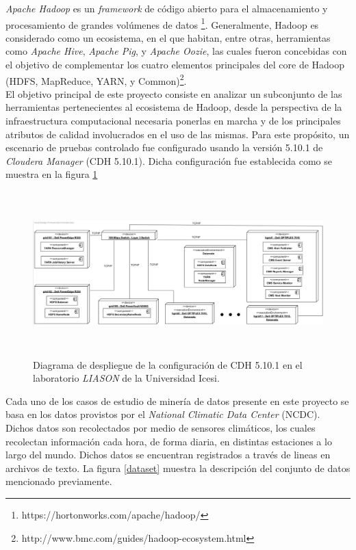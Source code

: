 \textit{Apache Hadoop} es un \textit{framework} de código abierto para el almacenamiento y procesamiento de grandes volúmenes de datos \footnote{https://hortonworks.com/apache/hadoop/}. Generalmente, Hadoop es considerado como un ecosistema, en el que habitan, entre otras, herramientas como \textit{Apache Hive}, \textit{Apache Pig}, y \textit{Apache Oozie}, las cuales fueron concebidas con el objetivo de complementar los cuatro elementos principales del core de Hadoop (HDFS, MapReduce, YARN, y Common)\footnote{http://www.bmc.com/guides/hadoop-ecosystem.html}. \\

El objetivo principal de este proyecto consiste en analizar un subconjunto de las herramientas pertenecientes al ecosistema de Hadoop, desde la perspectiva de la infraestructura computacional necesaria ponerlas en marcha y de los principales atributos de calidad involucrados en el uso de las mismas. Para este propósito, un escenario de pruebas controlado fue configurado usando la versión 5.10.1 de \textit{Cloudera Manager} (CDH 5.10.1). Dicha configuración fue establecida como se muestra en la figura \ref{deployment_diagram}

\begin{figure}[H]
\label{deployment_diagram}
  \centering
      \includegraphics[width=\textwidth, height=2.5in]{fig/deployment}
  \caption{Diagrama de despliegue de la configuración de CDH 5.10.1 en el laboratorio \textit{LIASON} de la Universidad Icesi.}
\end{figure}

Cada uno de los casos de estudio de minería de datos presente en este proyecto se basa en los datos provistos por el \textit{National Climatic Data Center} (NCDC). Dichos datos son recolectados por medio de sensores climáticos, los cuales recolectan información cada hora, de forma diaria, en distintas estaciones a lo largo del mundo. Dichos datos se encuentran registrados a través de lineas en archivos de texto. La figura \ref{dataset} muestra la descripción del conjunto de datos mencionado previamente. \\

